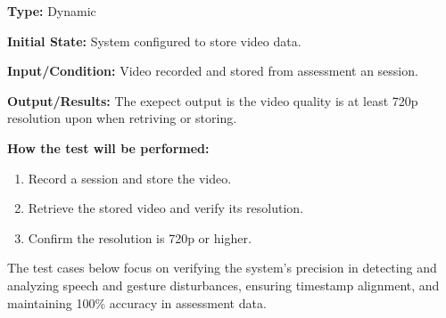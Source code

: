 \documentclass[12pt, titlepage]{article}
\begin{document}
\begin{itemize}
  \begin{mdframed}[linewidth=0.5mm]
      \textbf{Type:} Dynamic \par
      \textbf{Initial State:} System configured to store video data. \par
      \textbf{Input/Condition:} Video recorded and stored from assessment an session. \par
      \textbf{Output/Results:} The exepect output is the video quality is at least 720p resolution upon when retriving or storing. \par
      \textbf{How the test will be performed:}
      \begin{enumerate}[noitemsep]
        \item Record a session and store the video.
        \item Retrieve the stored video and verify its resolution.
        \item Confirm the resolution is 720p or higher.
      \end{enumerate}
  \end{mdframed}
\end{itemize}

\hspace{2em}The test cases below focus on verifying the system's precision in detecting and 
analyzing speech and gesture disturbances, ensuring timestamp alignment, and maintaining 
100\% accuracy in assessment data. 
\end{document}
